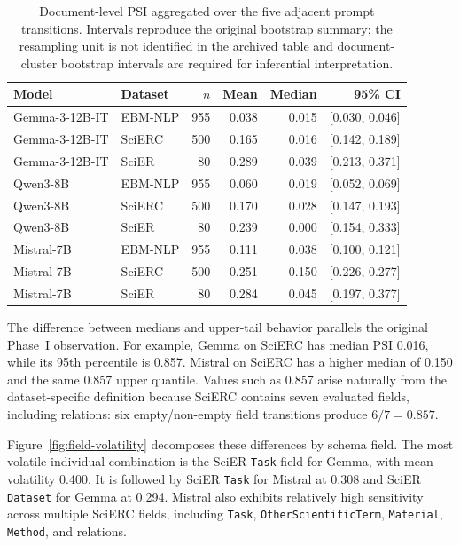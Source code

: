 \documentclass[fleqn,10pt]{wlscirep-authoryear}
\begin{document}
\begin{table}[t]
\centering
\caption{Document-level PSI aggregated over the five adjacent prompt transitions.
Intervals reproduce the original bootstrap summary; the resampling unit is
not identified in the archived table and document-cluster bootstrap intervals
are required for inferential interpretation.}
\label{tab:psi-summary}
\begin{tabular}{llrrrr}
\toprule
Model & Dataset & $n$ & Mean & Median & 95\% CI \\
\midrule
Gemma-3-12B-IT
& EBM-NLP & 955 & 0.038 & 0.015 & [0.030, 0.046] \\
Gemma-3-12B-IT
& SciERC  & 500 & 0.165 & 0.016 & [0.142, 0.189] \\
Gemma-3-12B-IT
& SciER   &  80 & 0.289 & 0.039 & [0.213, 0.371] \\
\addlinespace
Qwen3-8B
& EBM-NLP & 955 & 0.060 & 0.019 & [0.052, 0.069] \\
Qwen3-8B
& SciERC  & 500 & 0.170 & 0.028 & [0.147, 0.193] \\
Qwen3-8B
& SciER   &  80 & 0.239 & 0.000 & [0.154, 0.333] \\
\addlinespace
Mistral-7B
& EBM-NLP & 955 & 0.111 & 0.038 & [0.100, 0.121] \\
Mistral-7B
& SciERC  & 500 & 0.251 & 0.150 & [0.226, 0.277] \\
Mistral-7B
& SciER   &  80 & 0.284 & 0.045 & [0.197, 0.377] \\
\bottomrule
\end{tabular}
\end{table}

The difference between medians and upper-tail behavior parallels the original
Phase~I observation. For example, Gemma on SciERC has median PSI 0.016, while its
95th percentile is 0.857. Mistral on SciERC has a higher median of 0.150 and the
same 0.857 upper quantile. Values such as 0.857 arise naturally from the
dataset-specific definition because SciERC contains seven evaluated fields,
including relations: six empty/non-empty field transitions produce
$6/7=0.857$.

Figure~\ref{fig:field-volatility} decomposes these differences by schema field.
The most volatile individual combination is the SciER \texttt{Task} field for
Gemma, with mean volatility 0.400. It is followed by SciER \texttt{Task} for
Mistral at 0.308 and SciER \texttt{Dataset} for Gemma at 0.294.
Mistral also exhibits relatively high sensitivity across multiple SciERC fields,
including \texttt{Task}, \texttt{OtherScientificTerm}, \texttt{Material},
\texttt{Method}, and relations.
\end{document}
